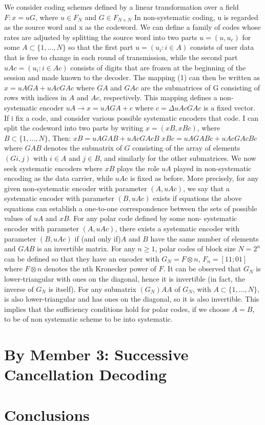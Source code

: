 \documentclass{report}
\begin{document}
We consider coding schemes defined by a linear transformation over a field $F: x=uG$, where $u \in F_{N}$ and $ G \in F_{N \times N}$
In non-systematic coding, u is regarded as the source word and x as the codeword. We can define a family of codes whose rates are adjusted by splitting the source word into two parts $u = (u,u_{c})$ for some $A \subset \{1,...,N\}$ so that the first part $u = (u_{i} : i \in A)$ consists of user data that is free to change in each round of transmission, while the second part $uAc = (u_{i} : i \in Ac)$ consists of digits that are frozen at the beginning of the session and made known to the decoder. The mapping (1) can then be written as
$x=uAGA +uAcGAc$ 
where $GA$ and $GAc$ are the submatrices of G consisting of rows with indices in $A$ and $Ac$, respectively. This mapping defines a non-systematic encoder $uA \rightarrow x = uAGA + c$ where $c =\Delta uAc GAc$ is a fixed vector.
If i fix a code, and consider various possible systematic encoders that code. I can split the codeword into two parts by writing $x = (xB, xBc)$, where $B\subset \{1,...,N\}$, Then:
$xB =uAGAB +uAcGAcB$
$xBc =uAGABc +uAcGAcBc$
where $GAB$ denotes the submatrix of $G$ consisting of the array of elements $(Gi,j)$ with $i \in A$ and $j \in B$, and similarly for the other submatrices. We now seek systematic encoders where $xB$ plays the role $uA$ played in non-systematic encoding as the data carrier, while $uAc$ is fixed as before. More precisely, for any given non-systematic encoder with parameter $(A,uAc)$, we say that a systematic encoder with parameter $(B, uAc)$ exists if equations the above equations can establish a one-to-one correspondence between the sets of possible values of $uA$ and $xB$.
For any polar code defined by some non- systematic encoder with parameter $(A,uAc)$, there exists a systematic encoder with parameter $(B, uAc)$ if (and only if)$A$ and $B$ have the same number of elements and $GAB$ is an invertible matrix.
For any $n \geq 1$, polar codes of block size $N=2^{n}$ can be defined so that they have an encoder with
$G_{N}=F \otimes n$, $F_{n}=[1 1; 0 1]$ 
where $F\otimes n$ denotes the nth Kronecker power of $F$.
It can be observed that $G_{N}$ is lower-triangular with ones on the diagonal, hence it is invertible (in fact, the inverse of $G_{N}$ is itself). For any submatrix $(G_{N})AA$ of $G_{N}$, with $A \subset \{1,...,N\}$, is also lower-triangular and has ones on the diagonal, so it is also invertible.
This implies that the sufficiency conditions hold for polar codes, if we choose $A = B$, to be of non systematic scheme to be into systematic.
\newpage
\section*{By Member 3: Successive Cancellation Decoding}

\newpage
\section*{Conclusions}
\end{document}
